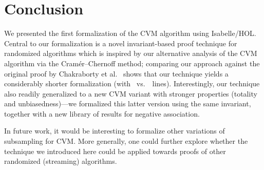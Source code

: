 \section{Conclusion}\label{sec:conclusion}
We presented the first formalization of the CVM algorithm using Isabelle/HOL.
Central to our formalization is a novel invariant-based proof technique for randomized algorithms which is inspired by our alternative analysis of the CVM algorithm via the Cram\'{e}r--Chernoff method; comparing our approach against the original proof by Chakraborty et al.~\cite{chakraborty2023} shows that our technique yields a considerably shorter formalization (with \locnew~vs.~\locold~lines).
Interestingly, our technique also readily generalized to a new CVM variant with stronger properties (totality and unbiasedness)---we formalized this latter version using the same invariant, together with a new library of results for negative association.

In future work, it would be interesting to formalize other variations of subsampling for CVM.
More generally, one could further explore whether the technique we introduced here could be applied towards proofs of other randomized (streaming) algorithms.
